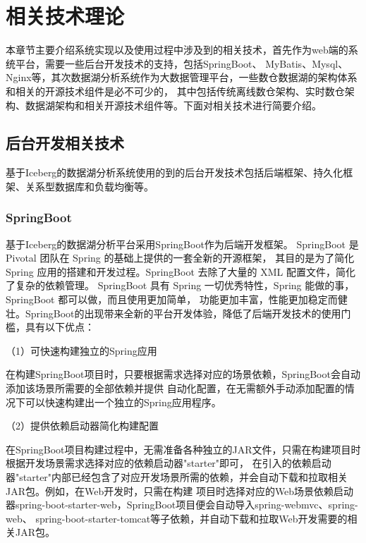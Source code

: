 
\chapter{相关技术理论}

本章节主要介绍系统实现以及使用过程中涉及到的相关技术，首先作为web端的系统平台，需要一些后台开发技术的支持，包括SpringBoot、
MyBatis、Mysql、Nginx等，其次数据湖分析系统作为大数据管理平台，一些数仓数据湖的架构体系和相关的开源技术组件是必不可少的，
其中包括传统离线数仓架构、实时数仓架构、数据湖架构和相关开源技术组件等。下面对相关技术进行简要介绍。

\section{后台开发相关技术}

基于Iceberg的数据湖分析系统使用的到的后台开发技术包括后端框架、持久化框架、关系型数据库和负载均衡等。

\subsection{SpringBoot}

基于Iceberg的数据湖分析平台采用SpringBoot作为后端开发框架。
SpringBoot 是 Pivotal 团队在 Spring 的基础上提供的一套全新的开源框架，
其目的是为了简化 Spring 应用的搭建和开发过程。SpringBoot 去除了大量的 XML 配置文件，简化了复杂的依赖管理。
SpringBoot 具有 Spring 一切优秀特性，Spring 能做的事，SpringBoot 都可以做，而且使用更加简单，
功能更加丰富，性能更加稳定而健壮。SpringBoot的出现带来全新的平台开发体验，降低了后端开发技术的使用门槛，具有以下优点：

（1）可快速构建独立的Spring应用

在构建SpringBoot项目时，只要根据需求选择对应的场景依赖，SpringBoot会自动添加该场景所需要的全部依赖并提供
自动化配置，在无需额外手动添加配置的情况下可以快速构建出一个独立的Spring应用程序。

（2）提供依赖启动器简化构建配置

在SpringBoot项目构建过程中，无需准备各种独立的JAR文件，只需在构建项目时根据开发场景需求选择对应的依赖启动器"starter"即可，
在引入的依赖启动器"starter"内部已经包含了对应开发场景所需的依赖，并会自动下载和拉取相关JAR包。例如，在Web开发时，只需在构建
项目时选择对应的Web场景依赖启动器spring-boot-starter-web，SpringBoot项目便会自动导入spring-webmvc、spring-web、
spring-boot-starter-tomcat等子依赖，并自动下载和拉取Web开发需要的相关JAR包。

